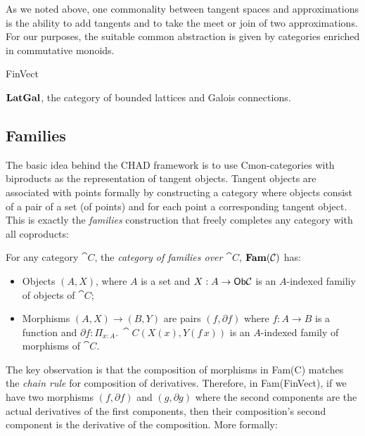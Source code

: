 As we noted above, one commonality between tangent spaces
and approximations is the ability to add tangents and to take the meet
or join of two approximations. For our purposes, the suitable common
abstraction is given by categories enriched in commutative monoids.

\begin{definition}
\end{definition}

\begin{definition}
\end{definition}

\begin{example}
  FinVect
\end{example}

\begin{example}
  $\mathbf{LatGal}$, the category of bounded lattices and Galois connections.
\end{example}

\subsection{Families}

The basic idea behind the CHAD framework is to use Cmon-categories
with biproducts as the representation of tangent objects. Tangent
objects are associated with points formally by constructing a category
where objects consist of a pair of a set (of points) and for each
point a corresponding tangent object. This is exactly the
\emph{families} construction that freely completes any category with
all coproducts:

\begin{definition}
  \label{def:category-of-families}
  For any category $\cat{C}$, the \emph{category of families over
    $\cat{C}$}, $\mathbf{Fam}(\mathcal{C})$ has:
  \begin{itemize}
  \item Objects $(A, X)$, where $A$ is a set and
    $X : A \to \mathsf{Ob}\mathcal{C}$ is an $A$-indexed familiy of objects of
    $\cat{C}$;
  \item Morphisms $(A, X) \to (B, Y)$ are pairs $(f, \partial f)$
    where $f : A \to B$ is a function and
    $\partial f : \Pi_{x : A}.~\cat{C}(X(x), Y(f\,x))$ is an
    $A$-indexed family of morphisms of $\cat{C}$.
  \end{itemize}
\end{definition}

The key observation is that the composition of morphisms in Fam(C)
matches the \emph{chain rule} for composition of
derivatives. Therefore, in Fam(FinVect), if we have two morphisms
$(f, \partial f)$ and $(g, \partial g)$ where the second components
are the actual derivatives of the first components, then their
composition's second component is the derivative of the
composition. More formally:

